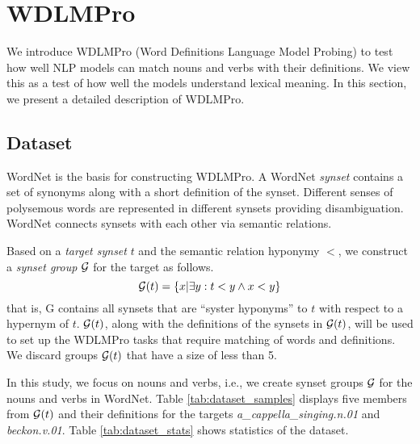 \documentclass[11pt,a4paper]{article}
\begin{document}
\section{WDLMPro}
We introduce  WDLMPro (Word Definitions Language Model
Probing) to test how well NLP models can match
nouns and verbs with  their
definitions.
We view this as a test of how well the models understand lexical meaning.
In this section, we
present a detailed description of WDLMPro.

\subsection{Dataset}
WordNet \cite{miller95wordnet} is the basis for
constructing WDLMPro.  A WordNet \textit{synset} contains a
set of synonyms along with a short definition of
the synset.  Different senses of polysemous words are
represented in different synsets providing
disambiguation. WordNet connects synsets with each other via
semantic relations.

Based on a \emph{target synset}
$t$ and the semantic relation hyponymy $<$, we construct
a \emph{synset group} $\cal G$ for the target as follows.
\[
  {\cal G}(t) = \{ x | \exists y: t<y \wedge x<y \}
  \]
that is, {\cal G} contains all synsets that are ``syster
hyponyms'' to $t$ with respect to a hypernym of $t$.
${\cal G}(t)$, along with the definitions of the synsets in
${\cal G}(t)$,
will be used to
set up the WDLMPro tasks that require matching of words and definitions.
We discard groups ${\cal G}(t)$ that
have a size of less than 5.


In this study, we focus on nouns and verbs, i.e., we create
synset groups ${\cal G}$ for the nouns and verbs in WordNet.
Table
\ref{tab:dataset_samples} displays five members from ${\cal
  G} (t)$ 
and their definitions
for the targets
\emph{a\_cappella\_singing.n.01} and
\emph{beckon.v.01}. 
Table \ref{tab:dataset_stats} shows statistics of the dataset.


  
\end{document}
